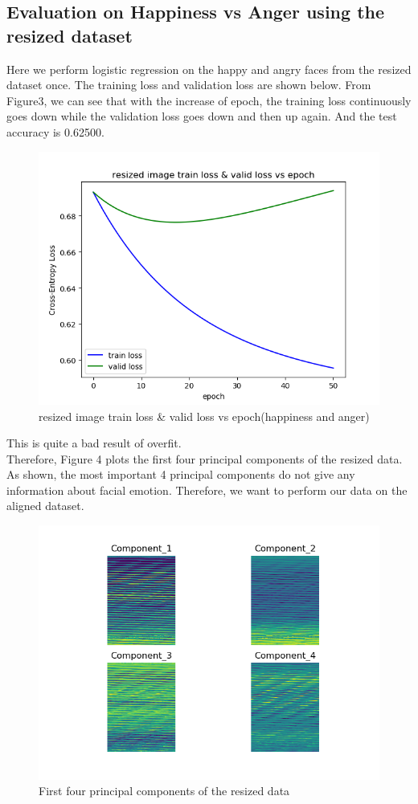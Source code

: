 \documentclass{article} %
\begin{document}
\subsection {Evaluation on Happiness vs Anger using the resized dataset}
Here we perform logistic regression on the happy and angry faces from the resized dataset once. The training loss and validation loss are shown below.
From Figure3, we can see that with the increase of epoch, the training loss continuously goes down while the validation loss goes down and then up again. And the test accuracy is 0.62500.
\begin{figure}[htb]
	\centering
	\includegraphics[scale=0.5]{./graph/resized_tvloss.png}
	\caption{resized image train loss \& valid loss vs epoch(happiness and anger)}
\end{figure} 
This is quite a bad result of overfit. \\
Therefore, Figure 4 plots the first four principal components of the resized data. As shown, the most important 4 principal components do not give any information about facial emotion. Therefore, we want to perform our data on the aligned dataset.
\begin{figure}[h]
	\centering
	\includegraphics[scale=0.5]{./graph/pca_resized.png}
	\caption{First four principal components of the resized data}
\end{figure} 
\end{document}
